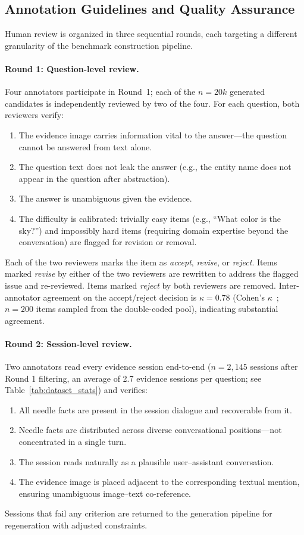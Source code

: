 \documentclass{article}
\begin{document}
\subsection{Annotation Guidelines and Quality Assurance}
\label{app:annotation}

Human review is organized in three sequential rounds, each targeting a different granularity of the benchmark construction pipeline.

\paragraph{Round 1: Question-level review.}
Four annotators participate in Round~1; each of the $n = 20k$ generated candidates is independently reviewed by two of the four. For each question, both reviewers verify:
\begin{enumerate}
    \item The evidence image carries information vital to the answer---the question cannot be answered from text alone.
    \item The question text does not leak the answer (e.g., the entity name does not appear in the question after abstraction).
    \item The answer is unambiguous given the evidence.
    \item The difficulty is calibrated: trivially easy items (e.g., ``What color is the sky?'') and impossibly hard items (requiring domain expertise beyond the conversation) are flagged for revision or removal.
\end{enumerate}
Each of the two reviewers marks the item as \emph{accept}, \emph{revise}, or \emph{reject}. Items marked \emph{revise} by either of the two reviewers are rewritten to address the flagged issue and re-reviewed. Items marked \emph{reject} by both reviewers are removed. Inter-annotator agreement on the accept/reject decision is $\kappa = 0.78$ (Cohen's $\kappa$~\cite{cohen1960coefficient}; $n = 200$ items sampled from the double-coded pool), indicating substantial agreement.

\paragraph{Round 2: Session-level review.}
Two annotators read every evidence session end-to-end ($n = 2{,}145$ sessions after Round 1 filtering, an average of 2.7 evidence sessions per question; see Table~\ref{tab:dataset_stats}) and verifies:
\begin{enumerate}
    \item All needle facts are present in the session dialogue and recoverable from it.
    \item Needle facts are distributed across diverse conversational positions---not concentrated in a single turn.
    \item The session reads naturally as a plausible user--assistant conversation.
    \item The evidence image is placed adjacent to the corresponding textual mention, ensuring unambiguous image--text co-reference.
\end{enumerate}
Sessions that fail any criterion are returned to the generation pipeline for regeneration with adjusted constraints.
\end{document}
